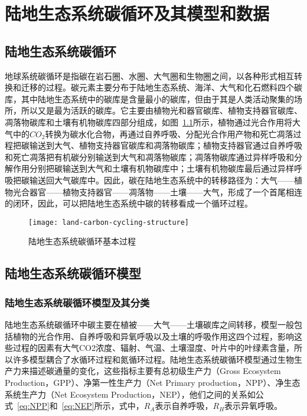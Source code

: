 \chapter{陆地生态系统碳循环及其模型和数据}
\label{chap:model}

\section{陆地生态系统碳循环}
地球系统碳循环是指碳在岩石圈、水圈、大气圈和生物圈之间，以各种形式相互转换和迁移的过程。碳元素主要分布于陆地生态系统、海洋、大气和化石燃料四个碳库，其中陆地生态系统中的碳库是含量最小的碳库，但由于其是人类活动聚集的场所，所以又是最为活跃的碳库。它主要由植物光和器官碳库、植物支持器官碳库、凋落物碳库和土壤有机物碳库四部分组成，如图~\ref{fig:land-carbon-cycling-structure}所示，植物通过光合作用将大气中的$CO_2$转换为碳水化合物，再通过自养呼吸、分配光合作用产物和死亡凋落过程把碳输送到大气、植物支持器官碳库和凋落物碳库；植物支持器官通过自养呼吸和死亡凋落把有机碳分别输送到大气和凋落物碳库；凋落物碳库通过异样呼吸和分解作用分别把碳输送到大气和土壤有机物碳库中；土壤有机物碳库最后通过异样呼吸把碳输送回大气碳库中。因此，碳在陆地生态系统中的转移路径为：大气——植物光合器官——植物支持器官——凋落物——土壤——大气，形成了一个首尾相连的闭环，因此，可以把陆地生态系统中碳的转移看成一个循环过程。

\begin{figure}[!htbp]
    \centering
    \texttt{[image: land-carbon-cycling-structure]}
    \caption{陆地生态系统碳循环基本过程}
    \label{fig:land-carbon-cycling-structure}
\end{figure}

\section{陆地生态系统碳循环模型}
\label{sec:model}
\subsection{陆地生态系统碳循环模型及其分类}
陆地生态系统碳循环中碳主要在植被——大气——土壤碳库之间转移，模型一般包括植物的光合作用、自养呼吸和异氧呼吸以及土壤的呼吸作用这四个过程，影响这些过程的因素有大气CO2浓度、辐射、气温、土壤湿度、叶片中的叶绿素含量，所以许多模型耦合了水循环过程和氮循环过程。陆地生态系统碳循环模型通过生物生产力来描述碳通量的变化，这些指标主要有总初级生产力（Gross Ecosystem Production，GPP）、净第一性生产力（Net Primary production，NPP）、净生态系统生产力（Net Ecosystem Production，NEP），他们之间的关系如公式~\ref{eq:NPP}和~\ref{eq:NEP}所示，式中，$R_A$表示自养呼吸，$R_H$表示异氧呼吸。

